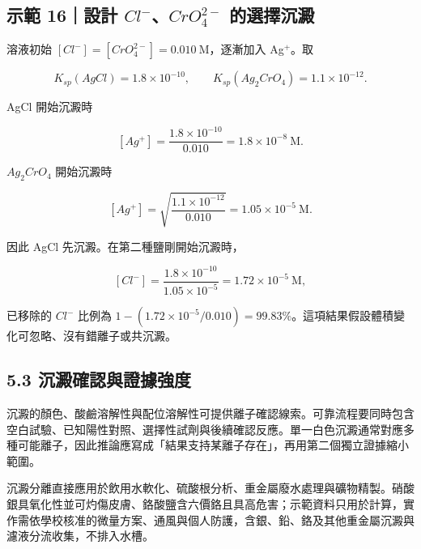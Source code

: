 \documentclass[11pt,a4paper]{article}
\begin{document}
\begin{HandoutWorkedExample}

\subsection{\texorpdfstring{示範 16｜設計 \(Cl^-\)、\(CrO_4^{2-}\) 的選擇沉澱}{示範 16｜設計 Cl\^{}-、CrO\_4\^{}\{2-\} 的選擇沉澱}}\label{ux793aux7bc4-16ux8a2dux8a08-cl-cro_42--ux7684ux9078ux64c7ux6c89ux6fb1}

溶液初始 \([Cl^-]=[CrO_4^{2-}]=0.010\ \mathrm M\)，逐漸加入 Ag\(^+\)。取

\[
K_{sp}(AgCl)=1.8\times10^{-10},\qquad
K_{sp}(Ag_2CrO_4)=1.1\times10^{-12}.
\]

AgCl 開始沉澱時

\[
[Ag^+]=\frac{1.8\times10^{-10}}{0.010}=1.8\times10^{-8}\ \mathrm M.
\]

\(Ag_2CrO_4\) 開始沉澱時

\[
[Ag^+]=\sqrt{\frac{1.1\times10^{-12}}{0.010}}
=1.05\times10^{-5}\ \mathrm M.
\]

因此 AgCl 先沉澱。在第二種鹽剛開始沉澱時，

\[
[Cl^-]=\frac{1.8\times10^{-10}}{1.05\times10^{-5}}
=1.72\times10^{-5}\ \mathrm M,
\]

已移除的 \(Cl^-\) 比例為 \(1-(1.72\times10^{-5}/0.010)=99.83\%\)。這項結果假設體積變化可忽略、沒有錯離子或共沉澱。

\end{HandoutWorkedExample}

\subsection{5.3 沉澱確認與證據強度}\label{ux6c89ux6fb1ux78baux8a8dux8207ux8b49ux64daux5f37ux5ea6}

沉澱的顏色、酸鹼溶解性與配位溶解性可提供離子確認線索。可靠流程要同時包含空白試驗、已知陽性對照、選擇性試劑與後續確認反應。單一白色沉澱通常對應多種可能離子，因此推論應寫成「結果支持某離子存在」，再用第二個獨立證據縮小範圍。

沉澱分離直接應用於飲用水軟化、硫酸根分析、重金屬廢水處理與礦物精製。硝酸銀具氧化性並可灼傷皮膚、鉻酸鹽含六價鉻且具高危害；示範資料只用於計算，實作需依學校核准的微量方案、通風與個人防護，含銀、鉛、鉻及其他重金屬沉澱與濾液分流收集，不排入水槽。
\end{document}
